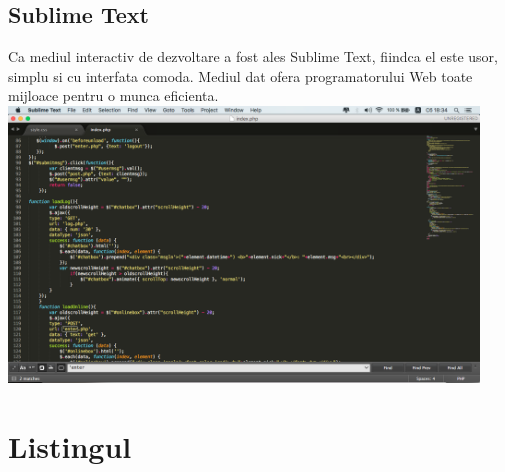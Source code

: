 \documentclass[12pt]{article}
\begin{document}
\subsection{Sublime Text}
Ca mediul interactiv de dezvoltare a fost ales Sublime Text, fiindca el este usor, simplu si cu interfata comoda. Mediul dat ofera programatorului Web toate mijloace pentru o munca eficienta. 
\newpage
\includegraphics[width=12.5cm]{images/5}
\section {Listingul}
\end{document}
